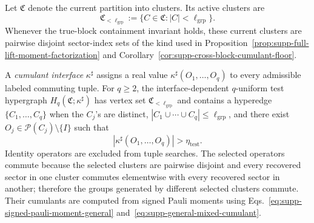 \documentclass[
  aps,
  prx,
  reprint,
  superscriptaddress,
  amsmath,
  amssymb,
  nofootinbib,
  longbibliography
]{revtex4-2}
\begin{document}
Let $\mathfrak C$ denote the current partition into clusters.  Its active
clusters are
\begin{equation}
\mathfrak C_{<\ell_{\mathrm{grp}}}
:=
\{C\in\mathfrak C: |C|<\ell_{\mathrm{grp}}\}.
\label{eq:supp-active-cluster-set}
\end{equation}
Whenever the true-block containment invariant holds, these current clusters
are pairwise disjoint sector-index sets of the kind used in
Proposition~\ref{prop:supp-full-lift-moment-factorization} and
Corollary~\ref{cor:supp-cross-block-cumulant-floor}.

A \emph{cumulant interface} $\kappa^\sharp$ assigns a real value
$\kappa^\sharp(O_1,\dots,O_q)$ to every admissible labeled commuting tuple.
For $q\ge 2$, the interface-dependent $q$-uniform test hypergraph
$H_q(\mathfrak C;\kappa^\sharp)$ has vertex set
$\mathfrak C_{<\ell_{\mathrm{grp}}}$ and contains a hyperedge
$\{C_1,\dots,C_q\}$ when the $C_j$'s are distinct,
$|C_1\cup\cdots\cup C_q|\le\ell_{\mathrm{grp}}$, and there exist
$O_j\in\mathcal P(C_j)\setminus\{I\}$ such that
\begin{equation}
\left|
\kappa^\sharp(O_1,\dots,O_q)
\right|
>
\eta_{\mathrm{test}} .
\end{equation}
Identity operators are excluded from tuple searches.  The selected operators
commute because the selected clusters are pairwise disjoint and every
recovered sector in one cluster commutes elementwise with every recovered
sector in another; therefore the groups generated by different selected
clusters commute.  Their cumulants are computed from signed Pauli moments
using Eqs.~\eqref{eq:supp-signed-pauli-moment-general}
and~\eqref{eq:supp-general-mixed-cumulant}.
\end{document}
